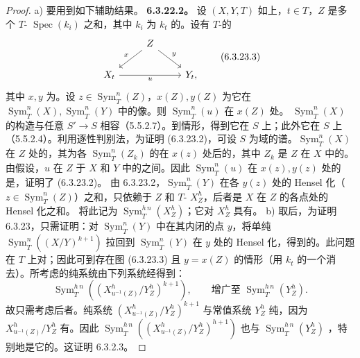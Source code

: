 \begin{proof}
a) 要用到如下辅助结果。
\textbf{6.3.22.2。} 设 $(X,Y,T)$ 如上，$t\in T$，$Z$ 是多个 $T$- $\operatorname{Spec}(k_i)$ 之和，其中 $k_i$ 为 $k_t$ 的。设有 $T$-的
\[\begin{tikzcd}&Z\arrow[dl,"x"']\arrow[dr,"y"]&\\X_t\arrow[rr,"u"']&&Y_t,\end{tikzcd}\tag{6.3.23.3}\]
其中 $x,y$ 为。设 $z\in\operatorname{Sym}_T^n(Z)$，$x(Z),y(Z)$ 为它在 $\operatorname{Sym}_T^n(X),\operatorname{Sym}_T^n(Y)$ 中的像。则 $\operatorname{Sym}_T^n(u)$ 在 $x(Z)$ 处。
 $\operatorname{Sym}_T^n(X)$ 的构造与任意 $S'\to S$ 相容（5.5.2.7）。到情形，得到它在 $S$ 上；此外它在 $S$ 上（5.5.2.4）。利用逐性判别法，为证明 (6.3.23.2)，可设 $S$ 为域的谱。$\operatorname{Sym}_T^n(X)$ 在 $Z$ 处的，其为各 $\operatorname{Sym}_T^n(Z_k)$ 的在 $x(z)$ 处后的，其中 $Z_k$ 是 $Z$ 在 $X$ 中的。由假设，$u$ 在 $Z$ 于 $X$ 和 $Y$ 中的之间。因此 $\operatorname{Sym}_T^n(u)$ 在 $x(z),y(z)$ 处的是，证明了 (6.3.23.2)。
由 6.3.23.2，$\operatorname{Sym}_T^n(Y)$ 在各 $y(z)$ 处的 Hensel 化（$z\in\operatorname{Sym}_T^n(Z)$）之和，只依赖于 $Z$ 和 $T$- $X_Z^h$，后者是 $X$ 在 $Z$ 的各点处的 Hensel 化之和。
将此记为 $\operatorname{Sym}_T^{h\,n}(X_Z^h)$；它对 $X_Z^h$ 具有。
b) 取后，为证明 6.3.23，只需证明：对 $\operatorname{Sym}_T^n(Y)$ 中在其内闭的点 $y$，将单纯 $\operatorname{Sym}_T^n((X/Y)^{k+1})$ 拉回到 $\operatorname{Sym}_T^n(Y)$ 在 $y$ 处的 Hensel 化，得到的。此问题在 $T$ 上对；因此可到存在图 (6.3.23.3) 且 $y=x(Z)$ 的情形（用 $k_t$ 的一个消去）。所考虑的纯系统由下列系统经得到：
\[\operatorname{Sym}_T^{h\,n}((X_{u^{-1}(Z)}^h/Y_Z^h)^{k+1}),\qquad\text{增广至 }\operatorname{Sym}_T^{h\,n}(Y_Z^h).\]
故只需考虑后者。纯系统 $(X_{u^{-1}(Z)}^h/Y_Z^h)^{k+1}$ 与常值系统 $Y_Z^h$ 纯，因为 $X_{u^{-1}(Z)}^h/Y_Z^h$ 有。因此 $\operatorname{Sym}_T^{h\,n}((X_{u^{-1}(Z)}^h/Y_Z^h)^{h+1})$ 也与 $\operatorname{Sym}_T^{h\,n}(Y_Z^h)$ ，特别地是它的。这证明 6.3.2.3。
\end{proof}
